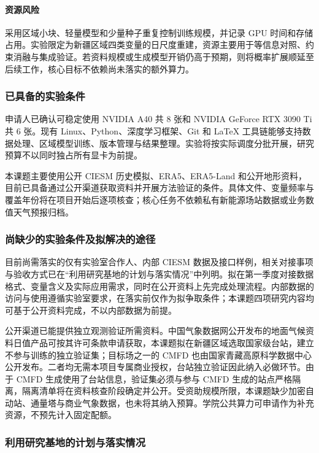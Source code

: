 \paragraph{资源风险}
采用区域小块、轻量模型和少量种子重复控制训练规模，并记录 GPU 时间和存储占用。实验限定为新疆区域四类变量的日尺度重建，资源主要用于等信息对照、约束消融与集成验证。若资料规模或生成模型开销仍高于预期，则将概率扩展顺延至后续工作，核心目标不依赖尚未落实的额外算力。

\subsubsection{已具备的实验条件}

申请人已确认可稳定使用 NVIDIA A40 共 8 张和 NVIDIA GeForce RTX 3090 Ti 共 6 张。现有 Linux、Python、深度学习框架、Git 和 LaTeX 工具链能够支持数据处理、区域模型训练、版本管理与结果整理。实验将按实际调度分批开展，研究预算不以同时独占所有显卡为前提。

本课题主要使用公开 CIESM 历史模拟、ERA5、ERA5-Land 和公开地形资料，目前已具备通过公开渠道获取资料并开展方法验证的条件。具体文件、变量频率与覆盖年份将在项目开始后逐项核查；核心任务不依赖私有新能源场站数据或业务数值天气预报归档。

\subsubsection{尚缺少的实验条件及拟解决的途径}

目前尚需落实的仅有实验室合作人、内部 CIESM 数据及接口样例，相关对接事项与验收方式已在“利用研究基地的计划与落实情况”中列明。拟在第一季度对接数据格式、变量含义及实际应用需求，同时在公开资料上先完成处理流程。内部数据的访问与使用遵循实验室要求，在落实前仅作为拟争取条件；本课题四项研究内容均可基于公开资料完成，不以内部数据为前提。

公开渠道已能提供独立观测验证所需资料。中国气象数据网公开发布的地面气候资料日值产品可按其许可条款申请获取，本课题拟在新疆区域选取国家级台站，建立不参与训练的独立验证集；目标场之一的 CMFD 也由国家青藏高原科学数据中心公开发布\cite{He2020CMFD}。二者均无需本项目专属商业授权，台站独立验证因此纳入必做环节。由于 CMFD 生成使用了台站信息，验证集必须与参与 CMFD 生成的站点严格隔离，隔离清单将在资料核查阶段确定并公开。受资助规模所限，本课题缺少加密自动站、通量塔与商业气象数据，也未将其纳入预算。学院公共算力可申请作为补充资源，不预先计入固定配额。

\subsubsection{利用研究基地的计划与落实情况}

